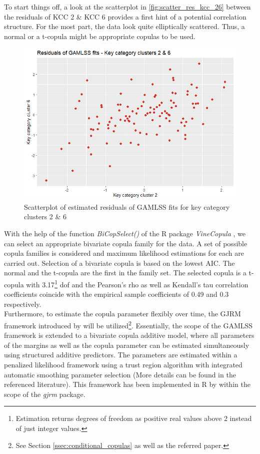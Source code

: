 
To start things off, a look at the scatterplot in \autoref{fig:scatter_res_kcc_26} between the residuals of \ac{KCC} 2 \& \ac{KCC} 6 provides a first hint of a potential correlation structure. For the most part, the data look quite elliptically scattered. Thus, a normal or a t-copula might be appropriate copulas to be used.
\\


\begin{figure}[H]
\centering
  \includegraphics[width=0.45\linewidth]{figures/scatter_res_kcc_26.png}
  \caption{Scatterplot of estimated residuals of GAMLSS fits for key category clusters 2 \& 6}
  \label{fig:scatter_res_kcc_26}
\end{figure}

With the help of the function \textit{BiCopSelect()} of the R package \textit{VineCopula} \citep{nagler2019vinecopula}, we can select an appropriate bivariate copula family for the data. A set of possible copula families is considered and maximum likelihood estimations for each are carried out. Selection of a bivariate copula is based on the lowest \ac{AIC}. The normal and the t-copula are the first in the family set. The selected copula is a t-copula with 3.17\footnote{Estimation returns degrees of freedom as positive real values above 2 instead of just integer values.} \ac{dof} and the Pearson's rho as well as Kendall's tau correlation coefficients coincide with the empirical sample coefficients of 0.49 and 0.3 respectively.
\\

Furthermore, to estimate the copula parameter flexibly over time, the \ac{GJRM} framework introduced by \cite{marra1605bivariate} will be utilized\footnote{See Section \ref{ssec:conditional_copulas} as well as the referred paper.}. Essentially, the scope of the \ac{GAMLSS} framework is extended to a bivariate copula additive model, where all parameters of the margins as well as the copula parameter can be estimated simultaneously using structured additive predictors. The parameters are estimated within a penalized likelihood framework using a trust region algorithm with integrated automatic smoothing parameter selection (More details can be found in the referenced literature). This framework has been implemented in R by \cite{marragjrm} within the scope of the \textit{gjrm} package. \\

